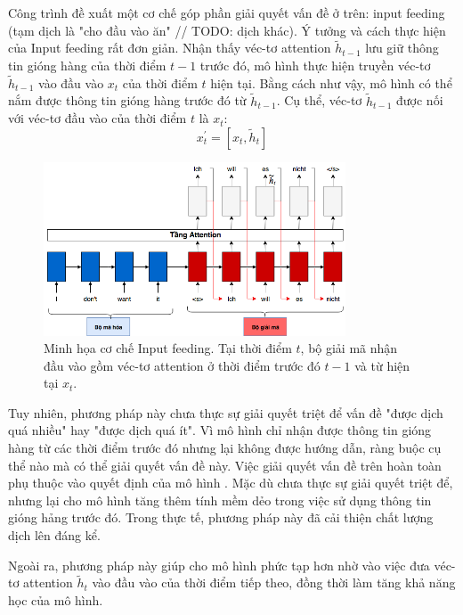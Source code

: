 Công trình \cite{attentionThangLuong2015} đề xuất một cơ chế góp phần giải quyết vấn đề ở trên: input feeding (tạm dịch là "cho đầu vào ăn" // TODO: dịch khác). Ý tưởng và cách thực hiện của Input feeding rất đơn giản. Nhận thấy véc-tơ attention $\tilde{h}_{t-1}$ lưu giữ thông tin gióng hàng của thời điểm $t-1$ trước đó, mô hình thực hiện truyền véc-tơ $\tilde{h}_{t-1}$ vào đầu vào $x_t$ của thời điểm $t$ hiện tại. Bằng cách như vậy, mô hình có thể nắm được thông tin gióng hàng trước đó từ $\tilde{h}_{t-1}$. Cụ thể, véc-tơ $\tilde{h}_{t-1}$ được nối với véc-tơ đầu vào của thời điểm $t$ là $x_t$:
\begin{equation}
x^{'}_t = [x_t, \tilde{h}_t]
\end{equation}

\begin{figure}
	\centering
	\includegraphics[width=0.8\textwidth]{Input-feeding_2.png}
	\caption[Minh họa cơ chế Attention Cục bộ.]{Minh họa cơ chế Input feeding. Tại thời điểm $t$, bộ giải mã nhận đầu vào gồm véc-tơ attention ở thời điểm trước đó $t-1$ và từ hiện tại $x_t$.}
	\label{fig_Input_feeding}
\end{figure}
Tuy nhiên, phương pháp này chưa thực sự giải quyết triệt để vấn đề "được dịch quá nhiều" hay "được dịch quá ít". Vì mô hình chỉ nhận được thông tin gióng hàng từ các thời điểm trước đó nhưng lại không được hướng dẫn, ràng buộc cụ thể nào mà có thể giải quyết vấn đề này. Việc giải quyết vấn đề trên hoàn toàn phụ thuộc vào quyết định của mô hình . Mặc dù chưa thực sự giải quyết triệt để, nhưng lại cho mô hình tăng thêm tính mềm dẻo trong việc sử dụng thông tin gióng hảng trước đó. Trong thực tế, phương pháp này đã cải thiện chất lượng dịch lên đáng kể.

Ngoài ra, phương pháp này giúp cho mô hình phức tạp hơn nhờ vào việc đưa véc-tơ attention $\tilde{h}_{t}$ vào đầu vào của thời điểm tiếp theo, đồng thời làm tăng khả năng học của mô hình.

